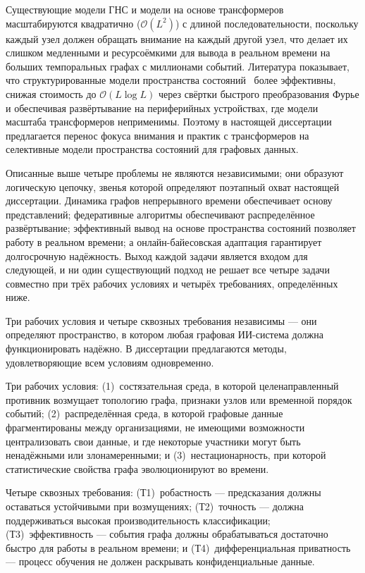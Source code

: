 Существующие модели ГНС и модели на основе трансформеров~\cite{Vaswani2017,Ying2021} масштабируются квадратично ($\mathcal{O}(L^2)$) с длиной последовательности, поскольку каждый узел должен обращать внимание на каждый другой узел, что делает их слишком медленными и ресурсоёмкими для вывода в реальном времени на больших темпоральных графах с миллионами событий. Литература показывает, что структурированные модели пространства состояний~\cite{Gu2022,Gu2024,Dao2024,Behrouz2024graphmamba} более эффективны, снижая стоимость до $\mathcal{O}(L\log L)$ через свёртки быстрого преобразования Фурье и обеспечивая развёртывание на периферийных устройствах, где модели масштаба трансформеров неприменимы. Поэтому в настоящей диссертации предлагается перенос фокуса внимания и практик с трансформеров на селективные модели пространства состояний для графовых данных.

Описанные выше четыре проблемы не являются независимыми; они образуют логическую цепочку, звенья которой определяют поэтапный охват настоящей диссертации. Динамика графов непрерывного времени обеспечивает основу представлений; федеративные алгоритмы обеспечивают распределённое развёртывание; эффективный вывод на основе пространства состояний позволяет работу в реальном времени; а онлайн-байесовская адаптация гарантирует долгосрочную надёжность. Выход каждой задачи является входом для следующей, и ни один существующий подход не решает все четыре задачи совместно при трёх рабочих условиях и четырёх требованиях, определённых ниже.


Три рабочих условия и четыре сквозных требования независимы --- они определяют пространство, в котором любая графовая ИИ-система должна функционировать надёжно. В диссертации предлагаются методы, удовлетворяющие всем условиям одновременно.

Три рабочих условия: (1)~состязательная среда, в которой целенаправленный противник возмущает топологию графа, признаки узлов или временной порядок событий; (2)~распределённая среда, в которой графовые данные фрагментированы между организациями, не имеющими возможности централизовать свои данные, и где некоторые участники могут быть ненадёжными или злонамеренными; и (3)~нестационарность, при которой статистические свойства графа эволюционируют во времени.

Четыре сквозных требования: (Т1)~робастность --- предсказания должны оставаться устойчивыми при возмущениях; (Т2)~точность --- должна поддерживаться высокая производительность классификации; (Т3)~эффективность --- события графа должны обрабатываться достаточно быстро для работы в реальном времени; и (Т4)~дифференциальная приватность --- процесс обучения не должен раскрывать конфиденциальные данные.

